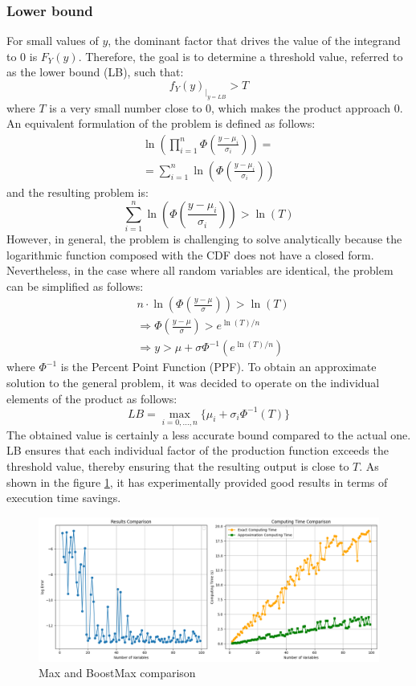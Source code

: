 \subsubsection{Lower bound}
For small values of \( y \), the dominant factor that drives the value of the integrand to 0 is \( F_Y(y) \). Therefore, the goal is to determine a threshold value, referred to as the lower bound (LB), such that:
$$f_Y(y)_{|_{y = LB}} > T $$
where \( T \) is a very small number close to 0, which makes the product approach 0. An equivalent formulation of the problem is defined as follows:
\begin{align*}
    \ln{\left(\prod_{i = 1}^n \Phi\left(\frac{y - \mu_i}{\sigma_i}\right)\right)} = \\
    = \sum_{i=1}^n  \ln{\left(\Phi\left(\frac{y - \mu_i}{\sigma_i}\right)\right)}
\end{align*}
and the resulting problem is:
$$ \sum_{i=1}^n  \ln{\left(\Phi\left(\frac{y - \mu_i}{\sigma_i}\right)\right)} > \ln(T) $$
However, in general, the problem is challenging to solve analytically because the logarithmic function composed with the CDF does not have a closed form. Nevertheless, in the case where all random variables are identical, the problem can be simplified as follows:
\begin{align*}
    &n \cdot \ln{\left(\Phi\left(\frac{y - \mu}{\sigma}\right)\right)} > \ln(T) \\
    & \Rightarrow \Phi\left(\frac{y - \mu}{\sigma}\right) > e^{\ln(T) / n} \\
    & \Rightarrow y > \mu + \sigma \Phi^{-1}\left(e^{\ln(T) / n}\right)
\end{align*}
where $\Phi^{-1}$ is the Percent Point Function (PPF). To obtain an approximate solution to the general problem, it was decided to operate on the individual elements of the product as follows:
$$LB = \max_{i=0,...,n}\{\mu_i + \sigma_i \Phi^{-1}(T)\}$$
The obtained value is certainly a less accurate bound compared to the actual one.
LB ensures that each individual factor of the production function exceeds the threshold value, thereby ensuring that the resulting output is close to $T$.
As shown in the figure \ref{plot}, it has experimentally provided good results in terms of execution time savings.

\begin{figure}[h!]
	\centering
	\includegraphics[width=\textwidth]{../../code/notebooks/images/comparison.png} %
	\caption{Max and BoostMax comparison}
	\label{plot}
\end{figure}


